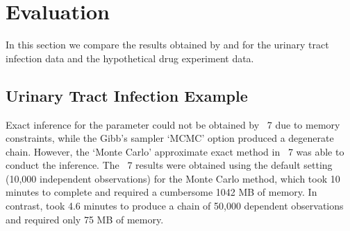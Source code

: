 \documentclass[article, shortnames]{jss}
\begin{document}
\section{Evaluation} \label{Evaluation}

In this section we compare the results obtained by  and
 for the urinary tract infection data and the
hypothetical drug experiment data.

\subsection{Urinary Tract Infection Example}

Exact inference for the  parameter could not be obtained
by ~7 due to memory constraints, while the Gibb's
sampler `MCMC' option produced a degenerate chain. However, the
`Monte Carlo' approximate exact method in ~7 was able
to conduct the inference. The ~7 results were
obtained using the default setting (10,000 independent
observations) for the Monte Carlo method, which took 10 minutes to
complete and required a cumbersome 1042 MB of memory. In contrast,
 took 4.6 minutes to produce a chain of 50,000 dependent
observations and required only 75 MB of memory.
\end{document}
